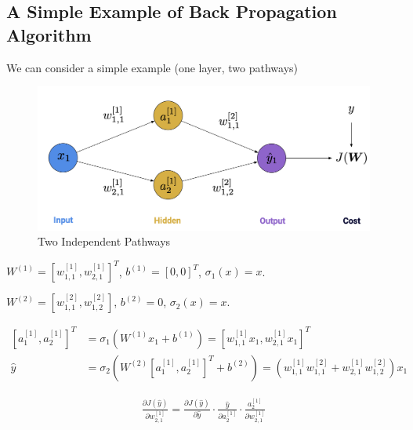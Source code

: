 \documentclass[11pt,a4paper]{article}
\begin{document}
\subsection{A Simple Example of Back Propagation Algorithm}
We can consider a simple example (one layer, two pathways)
\begin{center}\begin{figure}[htbp]
    \centering
    \includegraphics[scale=0.2]{2path.png}
    \caption{Two Independent Pathways}
    \label{}
\end{figure}\end{center}
$W^{(1)}=[w_{1,1}^{[1]},w_{2,1}^{[1]}]^T$, $b^{(1)}=[0,0]^T$, $\sigma_1(x)=x$.

$W^{(2)}=[w_{1,1}^{[2]},w_{1,2}^{[2]}]$, $b^{(2)}=0$, $\sigma_2(x)=x$.

\begin{equation}
    \begin{aligned}
        [a_1^{[1]},a_2^{[1]}]^T&=\sigma_1(W^{(1)}x_1+b^{(1)})=[w_{1,1}^{[1]}x_1,w_{2,1}^{[1]}x_1]^T\\
        \hat{y}&=\sigma_2(W^{(2)}[a_1^{[1]},a_2^{[1]}]^T+b^{(2)})=(w_{1,1}^{[1]}w_{1,1}^{[2]}+w_{2,1}^{[1]}w_{1,2}^{[2]})x_1
    \end{aligned}
    \nonumber
\end{equation}

\begin{equation}
    \begin{aligned}
        \frac{\partial J(\hat{y})}{\partial w_{2,1}^{[1]}}=\frac{\partial J(\hat{y})}{\partial \hat{y}}\cdot \frac{\hat{y}}{\partial a_2^{[1]}}\cdot\frac{a_2^{[1]}}{\partial w_{2,1}^{[1]}}
    \end{aligned}
    \nonumber
\end{equation}
\end{document}
